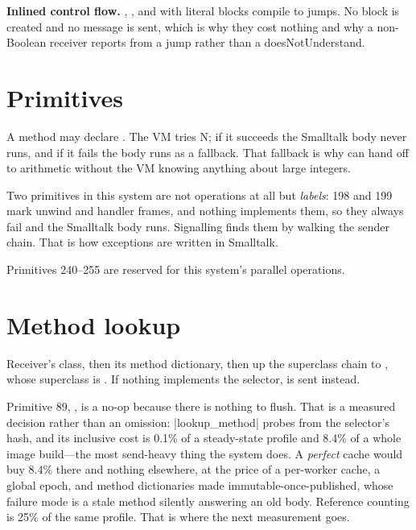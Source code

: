 \textbf{Inlined control flow.} , ,  and
 with literal blocks compile to jumps. No block is created and no
message is sent, which is why they cost nothing and why a non-Boolean receiver
reports  from a jump rather than a doesNotUnderstand.

\section{Primitives}

A method may declare . The VM tries N; if it succeeds the
Smalltalk body never runs, and if it fails the body runs as a fallback. That
fallback is why  can hand off to 
arithmetic without the VM knowing anything about large integers.

Two primitives in this system are not operations at all but \emph{labels}: 198
and 199 mark unwind and handler frames, and nothing implements them, so they
always fail and the Smalltalk body runs. Signalling finds them by walking the
sender chain. That is how exceptions are written in Smalltalk.

Primitives 240--255 are reserved for this system's parallel operations.

\section{Method lookup}

Receiver's class, then its method dictionary, then up the superclass chain to
, whose superclass is . If nothing implements the selector,
 is sent instead.

\begin{stnote}
Primitive 89, , is a no-op because there is nothing to flush.
That is a measured decision rather than an omission: \ct|lookup_method| probes
from the selector's hash, and its inclusive cost is 0.1\% of a steady-state
profile and 8.4\% of a whole image build---the most send-heavy thing the system
does. A \emph{perfect} cache would buy 8.4\% there and nothing elsewhere, at
the price of a per-worker cache, a global epoch, and method dictionaries made
immutable-once-published, whose failure mode is a stale method silently
answering an old body. Reference counting is 25\% of the same profile. That is
where the next measurement goes.
\end{stnote}

